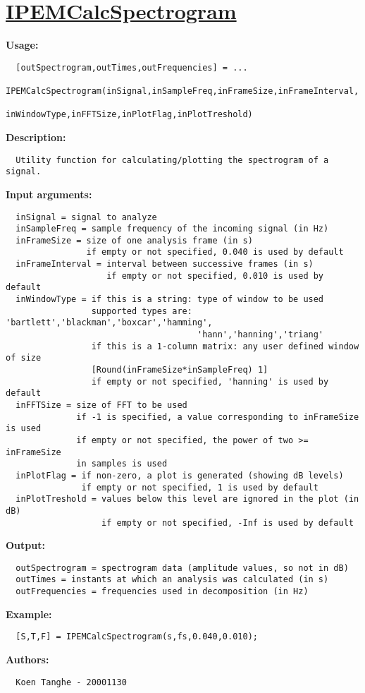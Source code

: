 \newpage
\section*{\hyperlink{Concepts:IPEMCalcSpectrogram}{IPEMCalcSpectrogram}}
\hypertarget{FuncRef:IPEMCalcSpectrogram}{}

\textbf{Usage:}
\begin{verbatim}  [outSpectrogram,outTimes,outFrequencies] = ...
    IPEMCalcSpectrogram(inSignal,inSampleFreq,inFrameSize,inFrameInterval,
                        inWindowType,inFFTSize,inPlotFlag,inPlotTreshold)

\end{verbatim}
\textbf{Description:}
\begin{verbatim}  Utility function for calculating/plotting the spectrogram of a signal.

\end{verbatim}
\textbf{Input arguments:}
\begin{verbatim}  inSignal = signal to analyze
  inSampleFreq = sample frequency of the incoming signal (in Hz)
  inFrameSize = size of one analysis frame (in s)
                if empty or not specified, 0.040 is used by default
  inFrameInterval = interval between successive frames (in s)
                    if empty or not specified, 0.010 is used by default
  inWindowType = if this is a string: type of window to be used
                 supported types are: 'bartlett','blackman','boxcar','hamming',
                                      'hann','hanning','triang'
                 if this is a 1-column matrix: any user defined window of size
                 [Round(inFrameSize*inSampleFreq) 1]
                 if empty or not specified, 'hanning' is used by default
  inFFTSize = size of FFT to be used
              if -1 is specified, a value corresponding to inFrameSize is used
              if empty or not specified, the power of two >= inFrameSize
              in samples is used
  inPlotFlag = if non-zero, a plot is generated (showing dB levels)
               if empty or not specified, 1 is used by default
  inPlotTreshold = values below this level are ignored in the plot (in dB)
                   if empty or not specified, -Inf is used by default

\end{verbatim}
\textbf{Output:}
\begin{verbatim}  outSpectrogram = spectrogram data (amplitude values, so not in dB)
  outTimes = instants at which an analysis was calculated (in s)
  outFrequencies = frequencies used in decomposition (in Hz)

\end{verbatim}
\textbf{Example:}
\begin{verbatim}  [S,T,F] = IPEMCalcSpectrogram(s,fs,0.040,0.010);

\end{verbatim}
\textbf{Authors:}
\begin{verbatim}  Koen Tanghe - 20001130
\end{verbatim}



